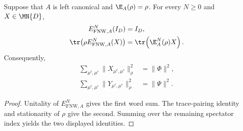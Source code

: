 \begin{lemma}
    \label{thm:fnw_spectator_family_norm_identities}
    \leanok
    Suppose that $A$ is left canonical and $\E_A(\rho)=\rho$. For every
    $N\geq0$ and $X\in\MN{D}$,
    \begin{align}
        E_{\mathrm{FNW},A}^N(I_D)
         & =I_D,
        \label{eq:fnw_word_unitality}        \\
        \tr\!\left(\rho E_{\mathrm{FNW},A}^N(X)\right)
         & =\tr\!\left(\E_A^N(\rho)X\right).
        \label{eq:fnw_power_trace_pairing}
    \end{align}
    Consequently,
    \begin{align}
        \sum_{\mu^\ell,\mu^r}
        \lVert X_{\mu^\ell,\mu^r}\rVert_\rho^2
         & =\lVert\Phi\rVert^2,
        \label{eq:fnw_left_middle_family_norm} \\
        \sum_{\mu^\ell,\mu^r}
        \lVert Y_{\mu^\ell,\mu^r}\rVert_\rho^2
         & =\lVert\Psi\rVert^2.
        \label{eq:fnw_right_middle_family_norm}
    \end{align}
\end{lemma}

\begin{proof}
    \leanok
    Unitality of $E_{\mathrm{FNW},A}^N$ gives the first word sum. The
    trace-pairing identity and stationarity of $\rho$ give the second. Summing
    over the remaining spectator index yields the two displayed identities.
\end{proof}

